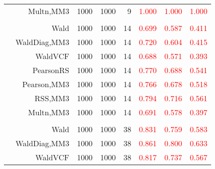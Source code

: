 \documentclass[
]{article}
\begin{document}
\begin{table}[H]
{\begin{tabular}[t]{lrrrrrrr}
\hspace{1em} & Multn,MM3 & 1000 & 1000 & 9 & \textcolor{red}{1.000} & \textcolor{red}{1.000} & \textcolor{red}{1.000}\\
\cmidrule{1-8}
\addlinespace[0.3em]
\multicolumn{8}{l}{\textbf{2F 10V}}\\
\hspace{1em} & Wald & 1000 & 1000 & 14 & \textcolor{red}{0.699} & \textcolor{red}{0.587} & \textcolor{red}{0.411}\\

\hspace{1em} & WaldDiag,MM3 & 1000 & 1000 & 14 & \textcolor{red}{0.720} & \textcolor{red}{0.604} & \textcolor{red}{0.415}\\

\hspace{1em} & WaldVCF & 1000 & 1000 & 14 & \textcolor{red}{0.688} & \textcolor{red}{0.571} & \textcolor{red}{0.393}\\

\hspace{1em} & PearsonRS & 1000 & 1000 & 14 & \textcolor{red}{0.770} & \textcolor{red}{0.688} & \textcolor{red}{0.541}\\

\hspace{1em} & Pearson,MM3 & 1000 & 1000 & 14 & \textcolor{red}{0.766} & \textcolor{red}{0.678} & \textcolor{red}{0.518}\\

\hspace{1em} & RSS,MM3 & 1000 & 1000 & 14 & \textcolor{red}{0.794} & \textcolor{red}{0.716} & \textcolor{red}{0.561}\\

\hspace{1em} & Multn,MM3 & 1000 & 1000 & 14 & \textcolor{red}{0.691} & \textcolor{red}{0.578} & \textcolor{red}{0.397}\\
\cmidrule{1-8}
\addlinespace[0.3em]
\multicolumn{8}{l}{\textbf{3F 15V}}\\
\hspace{1em} & Wald & 1000 & 1000 & 38 & \textcolor{red}{0.831} & \textcolor{red}{0.759} & \textcolor{red}{0.583}\\

\hspace{1em} & WaldDiag,MM3 & 1000 & 1000 & 38 & \textcolor{red}{0.861} & \textcolor{red}{0.800} & \textcolor{red}{0.633}\\

\hspace{1em} & WaldVCF & 1000 & 1000 & 38 & \textcolor{red}{0.817} & \textcolor{red}{0.737} & \textcolor{red}{0.567}\\


\end{tabular}}
\end{table}
\end{document}

